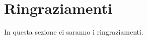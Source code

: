 \cleardoublepage



\bigskip

\begingroup

\let\clearpage\relax

\let\cleardoublepage\relax

\let\cleardoublepage\relax

\chapter*{Ringraziamenti}

In questa sezione ci saranno i ringraziamenti.

\endgroup
